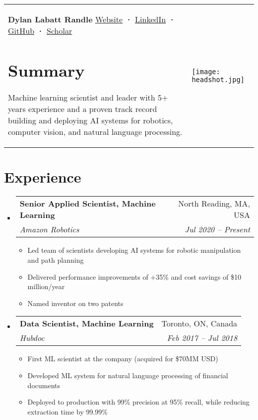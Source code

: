 \documentclass[a4paper,11pt]{article}
\makeatletter
\newcommand{\resumeItem}[1]{
  \item\small{#1}
}
\newcommand{\resumeItemListStart}{\begin{itemize}[rightmargin=0.11in]}
\newcommand{\resumeItemListEnd}{\end{itemize}}
\newcommand{\resumeQuadHeading}[4]{
  \item
  \begin{tabular*}{0.96\textwidth}[t]{l@{\extracolsep{\fill}}r}
    \textbf{#1} & #2 \\
    \textit{\small#3} & \textit{\small #4} \\
  \end{tabular*}
}
\newcommand{\resumeHeadingListStart}{
  \begin{itemize}[leftmargin=0.15in, label={}]
}
\newcommand{\resumeHeadingListEnd}{\end{itemize}}
\makeatother
\begin{document}
\begin{tabularx}{\linewidth}{@{}m{} m{}@{}}
{
    \textbf{\Huge Dylan Labatt Randle \vspace{2pt}} \newline
    \href{https://dylanrandle.github.io/}{\uline{Website}} \textbf{·}
    \href{https://linkedin.com/in/dylanrandle}{\uline{LinkedIn}} \textbf{·}
    \href{https://github.com/dylanrandle}{\uline{GitHub}} \textbf{·}
    \href{https://scholar.google.com/citations?user=62z1l9cAAAAJ}{\uline{Scholar}}
    \section{Summary}
    \small{
      Machine learning scientist and leader with 5+ years experience and a proven track record building and deploying AI systems for robotics, computer vision, and natural language processing.
    }
} & 
{
    \hfill
    \texttt{[image: headshot.jpg]}
}
\end{tabularx}


\section{Experience}
\resumeHeadingListStart{}
  \resumeQuadHeading{Senior Applied Scientist, Machine Learning}{North Reading, MA, USA}
  {Amazon Robotics}{Jul 2020 -- Present}
    \resumeItemListStart{}
      \resumeItem{Led team of scientists developing AI systems for robotic manipulation and path planning}
      \resumeItem{Delivered performance improvements of +35\% and cost savings of \$10 million/year}
      \resumeItem{Named inventor on two patents}
    \resumeItemListEnd{}
  \resumeQuadHeading{Data Scientist, Machine Learning}{Toronto, ON, Canada}
  {Hubdoc}{Feb 2017 -- Jul 2018}
    \resumeItemListStart{}
        \resumeItem{First ML scientist at the company (acquired for \$70MM USD)}
        \resumeItem{Developed ML system for natural language processing of financial documents}
        \resumeItem{Deployed to production with 99\% precision at 95\% recall, while reducing extraction time by 99.99\%}
    \resumeItemListEnd{}
\resumeHeadingListEnd{}
\end{document}
